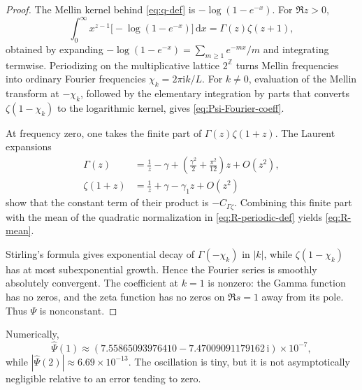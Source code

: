 \documentclass[11pt,oneside]{article}
\theoremstyle{definition}
\theoremstyle{remark}
\newcommand{\dd}{\,\mathrm d}
\newcommand{\ii}{\mathrm i}
\newcommand{\Z}{\mathbb Z}
\newcommand{\Ltwo}{L}
\newcommand{\PsiPer}{\Psi}
\begin{document}
\begin{proof}
The Mellin kernel behind \eqref{eq:q-def} is
$-\log(1-e^{-x})$.  For $\Re z>0$,
\begin{equation}\label{eq:Mellin-Bose}
 \int_0^{\infty}x^{z-1}\bigl[-\log(1-e^{-x})\bigr]\dd x
 =\Gamma(z)\zeta(z+1),
\end{equation}
obtained by expanding
$-\log(1-e^{-x})=\sum_{m\ge1}e^{-mx}/m$ and integrating termwise.
Periodizing on the multiplicative lattice $2^\Z$ turns Mellin frequencies into
ordinary Fourier frequencies $\chi_k=2\pi\ii k/\Ltwo$.  For $k\ne0$, evaluation of
the Mellin transform at $-\chi_k$, followed by the elementary integration by parts
that converts $\zeta(1-\chi_k)$ to the logarithmic kernel, gives
\eqref{eq:Psi-Fourier-coeff}.

At frequency zero, one takes the finite part of
$\Gamma(z)\zeta(1+z)$.  The Laurent expansions
\begin{align*}
 \Gamma(z)&=\frac1z-\gamma+
   \left(\frac{\gamma^2}{2}+\frac{\pi^2}{12}\right)z+O(z^2),\\
 \zeta(1+z)&=\frac1z+\gamma-\gamma_1z+O(z^2)
\end{align*}
show that the constant term of their product is $-C_{\Gamma\zeta}$.  Combining
this finite part with the mean of the quadratic normalization in
\eqref{eq:R-periodic-def} yields \eqref{eq:R-mean}.

Stirling's formula gives exponential decay of $\Gamma(-\chi_k)$ in $|k|$, while
$\zeta(1-\chi_k)$ has at most subexponential growth.  Hence the Fourier series is
smoothly absolutely convergent.  The coefficient at $k=1$ is nonzero: the Gamma
function has no zeros, and the zeta function has no zeros on $\Re s=1$ away from
its pole.  Thus $\PsiPer$ is nonconstant.
\end{proof}

Numerically,
\begin{equation}\label{eq:first-Psi-coeff-numeric}
 \widehat{\PsiPer}(1)
 \approx(7.55865093976410-7.47009091179162\,\ii)\times10^{-7},
\end{equation}
while $|\widehat{\PsiPer}(2)|\approx6.69\times10^{-13}$.  The oscillation is tiny,
but it is not asymptotically negligible relative to an error tending to zero.
\end{document}
